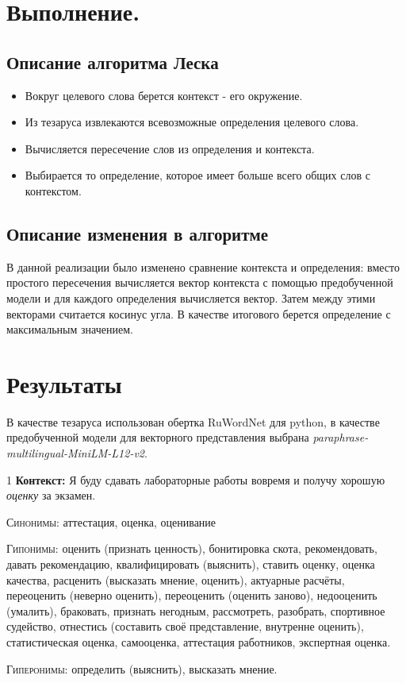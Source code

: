\documentclass[a4paper, 12pt]{article}
\begin{document}
\pagebreak


\section{Выполнение.}
\subsection{Описание алгоритма Леска}
    \begin{itemize}
        \item Вокруг целевого слова берется контекст - его окружение.
        \item Из тезаруса извлекаются всевозможные определения целевого слова.
        \item Вычисляется пересечение слов из определения и контекста.
        \item Выбирается то определение, которое имеет больше всего общих слов с контекстом.
    \end{itemize}
\subsection{Описание изменения в алгоритме}
    В данной реализации было изменено сравнение контекста и определения: вместо простого пересечения вычисляется вектор контекста с помощью предобученной модели и для каждого определения вычисляется вектор.
    Затем между этими векторами считается косинус угла. В качестве итогового берется определение с максимальным значением.
\section{Результаты}
    В качестве тезаруса использован обертка RuWordNet для python, в качестве предобученной модели для векторного представления выбрана \emph{paraphrase-multilingual-MiniLM-L12-v2}.
\begin{lexbox}{1}
  \noindent\textbf{Контекст:} Я буду сдавать лабораторные работы вовремя и получу хорошую \emph{оценку} за экзамен.

  \medskip
  \noindent\textsc{Синонимы:} аттестация, оценка, оценивание

  \noindent\textsc{Гипонимы:} оценить (признать ценность), бонитировка скота, рекомендовать, давать рекомендацию, квалифицировать (выяснить), ставить оценку, оценка качества, расценить (высказать мнение, оценить), актуарные расчёты, переоценить (неверно оценить), переоценить (оценить заново), недооценить (умалить), браковать, признать негодным, рассмотреть, разобрать, спортивное судейство, отнестись (составить своё представление, внутренне оценить), статистическая оценка, самооценка, аттестация работников, экспертная оценка.

  \noindent\textsc{Гиперонимы:} определить (выяснить), высказать мнение.
\end{lexbox}
\end{document}
